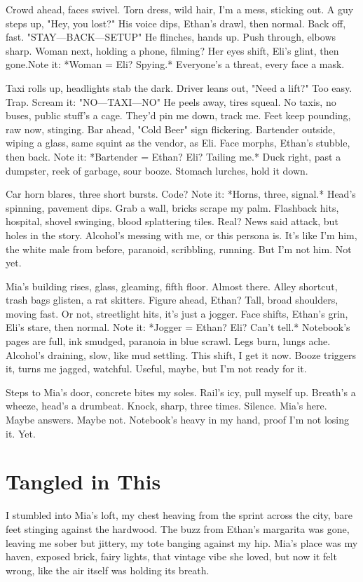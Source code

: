 \documentclass{article}
\begin{document}
Crowd ahead, faces swivel. Torn dress, wild hair, I'm a mess, sticking out. A guy steps up, "Hey, you lost?" His voice dips, Ethan's drawl, then normal. Back off, fast. "STAY—BACK—SETUP" He flinches, hands up. Push through, elbows sharp. Woman next, holding a phone, filming? Her eyes shift, Eli's glint, then gone.Note it: *Woman = Eli? Spying.* Everyone's a threat, every face a mask.

Taxi rolls up, headlights stab the dark. Driver leans out, "Need a lift?" Too easy. Trap. Scream it: "NO—TAXI—NO" He peels away, tires squeal. No taxis, no buses, public stuff's a cage. They'd pin me down, track me. Feet keep pounding, raw now, stinging. Bar ahead, "Cold Beer" sign flickering. Bartender outside, wiping a glass, same squint as the vendor, as Eli. Face morphs, Ethan's stubble, then back. Note it: *Bartender = Ethan? Eli? Tailing me.* Duck right, past a dumpster, reek of garbage, sour booze. Stomach lurches, hold it down.

Car horn blares, three short bursts. Code? Note it: *Horns, three, signal.* Head's spinning, pavement dips. Grab a wall, bricks scrape my palm. Flashback hits, hospital, shovel swinging, blood splattering tiles. Real? News said attack, but holes in the story. Alcohol's messing with me, or this persona is. It's like I'm him, the white male from before, paranoid, scribbling, running. But I'm not him. Not yet.

Mia's building rises, glass, gleaming, fifth floor. Almost there. Alley shortcut, trash bags glisten, a rat skitters. Figure ahead, Ethan? Tall, broad shoulders, moving fast. Or not, streetlight hits, it's just a jogger. Face shifts, Ethan's grin, Eli's stare, then normal. Note it: *Jogger = Ethan? Eli? Can't tell.* Notebook's pages are full, ink smudged, paranoia in blue scrawl. Legs burn, lungs ache. Alcohol's draining, slow, like mud settling. This shift, I get it now. Booze triggers it, turns me jagged, watchful. Useful, maybe, but I'm not ready for it.

Steps to Mia's door, concrete bites my soles. Rail's icy, pull myself up. Breath's a wheeze, head's a drumbeat. Knock, sharp, three times. Silence. Mia's here. Maybe answers. Maybe not. Notebook's heavy in my hand, proof I'm not losing it. Yet.

\section{Tangled in This}

I stumbled into Mia's loft, my chest heaving from the sprint across the city, bare feet stinging against the hardwood. The buzz from Ethan's margarita was gone, leaving me sober but jittery, my tote banging against my hip. Mia's place was my haven, exposed brick, fairy lights, that vintage vibe she loved, but now it felt wrong, like the air itself was holding its breath.
\end{document}
